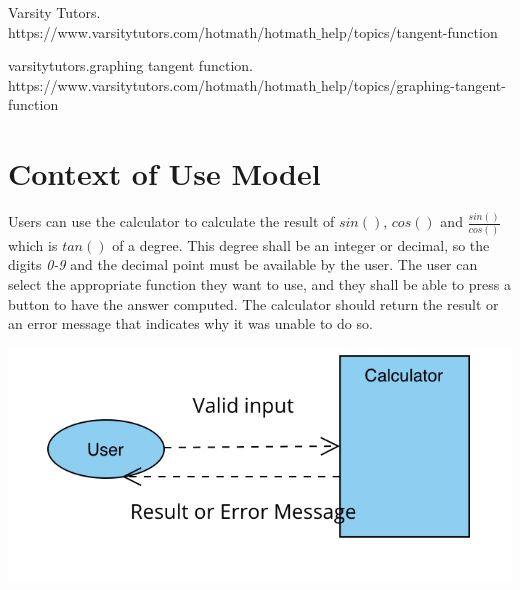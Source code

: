 \documentclass[letterpaper, 11pt]{report}
\begin{document}
 
 \begin{thebibliography}{}
 
Varsity Tutors.
\\https://www.varsitytutors.com/hotmath/hotmath$\_$help/topics/tangent-function

varsitytutors.graphing tangent function. 
\\https://www.varsitytutors.com/hotmath/hotmath$\_$help/topics/graphing-tangent-function

\end{thebibliography}
 
 
 
 
\pagebreak


\newpage
{}
\section*{Context of Use Model}
\normalsize{Users can use the calculator to calculate the result of $sin()$, $cos()$ and $\frac{sin()}{cos()}$ which is $tan()$ of a degree. This degree shall be an integer or decimal, so the digits \textit{0-9} and the decimal point must be available by the user. The user can select the appropriate function they want to use, and they shall be able to press a button to have the answer computed. The calculator should return the result or an error message that indicates why it was unable to do so.}
\begin{center}
\includegraphics[width=15cm]{context_diagram}
\end{center}
\end{document}
